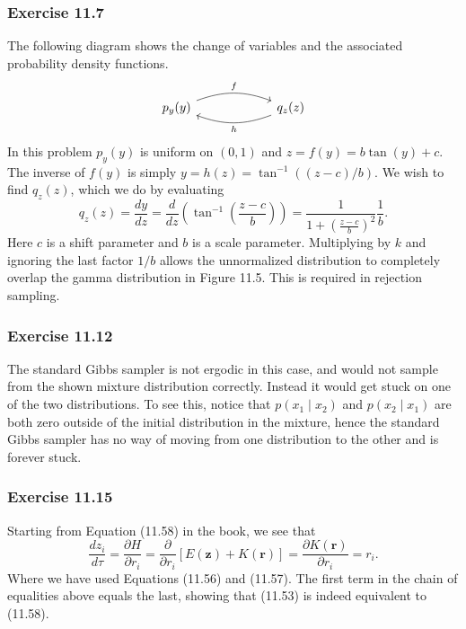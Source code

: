 \documentclass[12pt, a4paper]{article}
\newcommand{\vect}[1]{\bm{#1}}
\begin{document}
\subsubsection*{Exercise 11.7}
The following diagram shows the change of variables and the associated probability density functions.
\[\begin{tikzcd}[column sep=6em]
p_y(y) \arrow[bend left = 20]{r}{f} & q_z(z) \arrow[ bend left = 20]{l}{h}
\end{tikzcd}\]
In this problem $p_y(y)$ is uniform on $(0, 1)$ and $z = f(y) = b \tan (y) + c$.
The inverse of $f(y)$ is simply $y = h(z) = \tan^{-1}\left( (z- c) / b \right)$.
We wish to find $q_z(z)$, which we do by evaluating
\begin{equation*}
q_z(z) = \frac{d y}{d z} = \frac{d }{d z} \left( \tan^{-1}\left( \frac{z - c}{b} \right) \right)
=
\frac{1}{1 + \left( \frac{z - c}{b} \right)^2} \frac{1}{b}.
\end{equation*}
Here $c$ is a shift parameter and $b$ is a scale parameter.
Multiplying by $k$ and ignoring the last factor $1/b$ allows the unnormalized distribution to completely overlap the gamma distribution in Figure 11.5.
This is required in rejection sampling.


\subsubsection*{Exercise 11.12}
The standard Gibbs sampler is not ergodic in this case, and would not sample from the shown mixture distribution correctly.
Instead it would get stuck on one of the two distributions.
To see this, notice that $p(x_1 \mid x_2)$ and $p(x_2 \mid x_1)$ are both zero outside of the initial distribution in the mixture, hence the standard Gibbs sampler has no way of moving from one distribution to the other and is forever stuck.

\subsubsection*{Exercise 11.15}
Starting from Equation (11.58) in the book, we see that
\begin{equation*}
	\frac{d z_i}{d \tau} = \frac{\partial H}{\partial r_i}
	= \frac{\partial}{\partial r_i} \left[ E(\vect{z}) + K(\vect{r}) \right]
	= \frac{\partial K(\vect{r})}{\partial r_i} = r_i.
\end{equation*}
Where we have used Equations (11.56) and (11.57).
The first term in the chain of equalities above equals the last, showing that (11.53) is indeed equivalent to (11.58).
\end{document}
